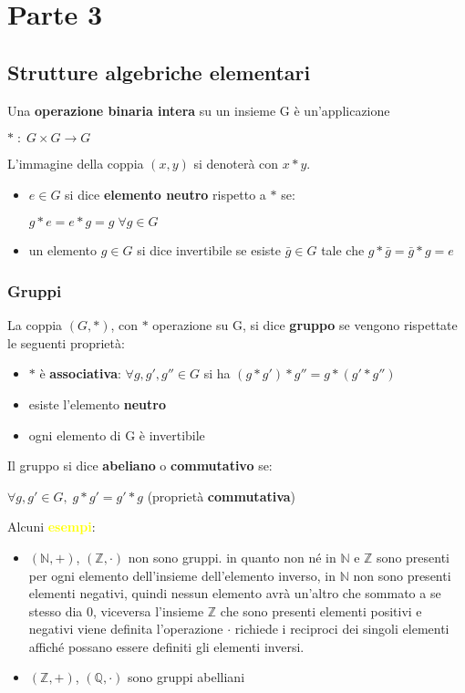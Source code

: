 \chapter{Parte 3}
\section{Strutture algebriche elementari}
Una \textbf{operazione binaria intera} su un insieme G è un'applicazione 
\begin{center}
    $\ast \; : \; G \times G \rightarrow G$
\end{center}
L'immagine della coppia $(x,y)$ si denoterà con $x \ast y$. 
\begin{itemize}
    \item $e \in G$ si dice \textbf{elemento neutro} rispetto a $\ast$ se:
    \begin{center}
        $g \ast e = e \ast g = g \; \forall g \in G$
    \end{center}
    \item un elemento $g \in G$ si dice invertibile se esiste $\bar{g} \in G$ tale che $g * \bar{g} = \bar{g} * g = e$
\end{itemize}

\subsection{Gruppi}
La coppia $(G, \ast)$, con $\ast$ operazione su G, si dice \textbf{gruppo} se vengono rispettate le seguenti proprietà:
\begin{itemize}
    \item $\ast$ è \textbf{associativa}: $\forall g, g', g'' \in G$ si ha $(g \ast g') \ast g'' = g \ast (g' \ast g'')$
    \item esiste l'elemento \textbf{neutro}
    \item ogni elemento di G è invertibile
\end{itemize}
Il gruppo si dice \textbf{abeliano} o \textbf{commutativo} se: 
\begin{center}
    $\forall g, g' \in G, \; g \ast g' = g' \ast g$ (proprietà \textbf{commutativa})
\end{center}
Alcuni \textcolor{yellow}{\textbf{esempi}}:
\begin{itemize}
    \item $(\mathbb{N}, +)$, $(\mathbb{Z}, \cdot)$ non sono gruppi. in quanto non né in $\mathbb{N}$ e $\mathbb{Z}$ sono presenti per ogni elemento dell'insieme dell'elemento inverso, in $\mathbb{N}$ non sono presenti elementi negativi, quindi nessun elemento avrà un'altro che sommato a se stesso dia 0, viceversa l'insieme $\mathbb{Z}$ che sono presenti elementi positivi e negativi viene definita l'operazione $\cdot$ richiede i reciproci dei singoli elementi affiché possano essere definiti gli elementi inversi.
    \item $(\mathbb{Z}, +)$, $(\mathbb{Q}, \cdot)$ sono gruppi abelliani
\end{itemize}


